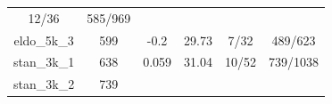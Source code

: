 \documentclass[twoside,12pt,final]{ucthesis-CA2012}
\begin{document}
\begin{ucmainmatter}
\begin{longtable}[]{@{}cccccc@{}}
\begin{minipage}[t]{0.18\columnwidth}
12/36\strut
\end{minipage} & \begin{minipage}[t]{0.22\columnwidth}\centering\strut
585/969\strut
\end{minipage}\tabularnewline
\begin{minipage}[t]{0.11\columnwidth}\centering\strut
eldo\_5k\_3\strut
\end{minipage} & \begin{minipage}[t]{0.07\columnwidth}\centering\strut
599\strut
\end{minipage} & \begin{minipage}[t]{0.11\columnwidth}\centering\strut
-0.2\strut
\end{minipage} & \begin{minipage}[t]{0.13\columnwidth}\centering\strut
29.73\strut
\end{minipage} & \begin{minipage}[t]{0.18\columnwidth}\centering\strut
7/32\strut
\end{minipage} & \begin{minipage}[t]{0.22\columnwidth}\centering\strut
489/623\strut
\end{minipage}\tabularnewline
\begin{minipage}[t]{0.11\columnwidth}\centering\strut
stan\_3k\_1\strut
\end{minipage} & \begin{minipage}[t]{0.07\columnwidth}\centering\strut
638\strut
\end{minipage} & \begin{minipage}[t]{0.11\columnwidth}\centering\strut
0.059\strut
\end{minipage} & \begin{minipage}[t]{0.13\columnwidth}\centering\strut
31.04\strut
\end{minipage} & \begin{minipage}[t]{0.18\columnwidth}\centering\strut
10/52\strut
\end{minipage} & \begin{minipage}[t]{0.22\columnwidth}\centering\strut
739/1038\strut
\end{minipage}\tabularnewline
\begin{minipage}[t]{0.11\columnwidth}\centering\strut
stan\_3k\_2\strut
\end{minipage} & \begin{minipage}[t]{0.07\columnwidth}\centering\strut
739\strut
\end{minipage} & \begin{minipage}[t]{0.11\columnwidth}\centering\strut

\end{minipage}
\end{longtable}
\end{ucmainmatter}
\end{document}
